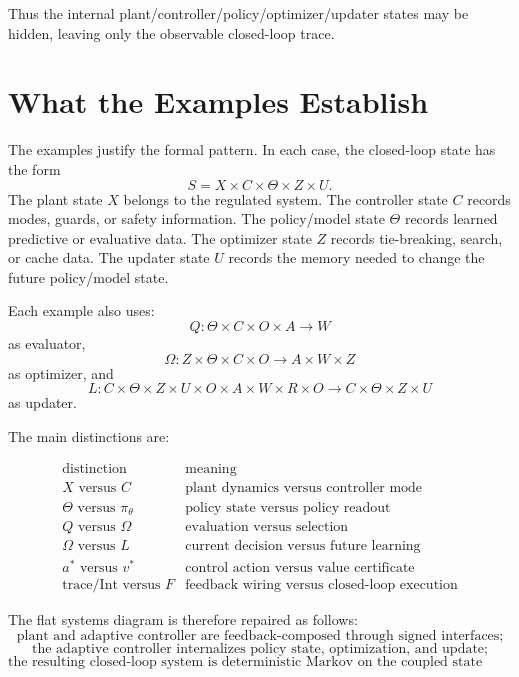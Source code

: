 Thus the internal plant/controller/policy/optimizer/updater states may be hidden, leaving only the
observable closed-loop trace.

\section{What the Examples Establish}
\label{sec:what-examples-establish}

The examples justify the formal pattern.  In each case, the closed-loop state has the form
\[
S=X\times C\times\Theta\times Z\times U.
\]
The plant state \(X\) belongs to the regulated system.  The controller state \(C\) records modes,
guards, or safety information.  The policy/model state \(\Theta\) records learned predictive or
evaluative data.  The optimizer state \(Z\) records tie-breaking, search, or cache data.  The
updater state \(U\) records the memory needed to change the future policy/model state.

Each example also uses:
\[
Q:\Theta\times C\times O\times A\longrightarrow W
\]
as evaluator,
\[
\Omega:Z\times\Theta\times C\times O\longrightarrow A\times W\times Z
\]
as optimizer, and
\[
L:
C\times\Theta\times Z\times U
\times O\times A\times W\times R\times O
\longrightarrow
C\times\Theta\times Z\times U
\]
as updater.

The main distinctions are:

\[
\begin{array}{c|l}
\text{distinction} & \text{meaning} \\
\hline
X \text{ versus } C & \text{plant dynamics versus controller mode} \\
\Theta \text{ versus } \pi_\theta & \text{policy state versus policy readout} \\
Q \text{ versus } \Omega & \text{evaluation versus selection} \\
\Omega \text{ versus } L & \text{current decision versus future learning} \\
a^* \text{ versus } v^* & \text{control action versus value certificate} \\
\text{trace/Int} \text{ versus } F & \text{feedback wiring versus closed-loop execution}
\end{array}
\]

The flat systems diagram is therefore repaired as follows:
\[
\boxed{
\text{plant and adaptive controller are feedback-composed through signed interfaces;}
}
\]
\[
\boxed{
\text{the adaptive controller internalizes policy state, optimization, and update;}
}
\]
\[
\boxed{
\text{the resulting closed-loop system is deterministic Markov on the coupled state object.}
}
\]

